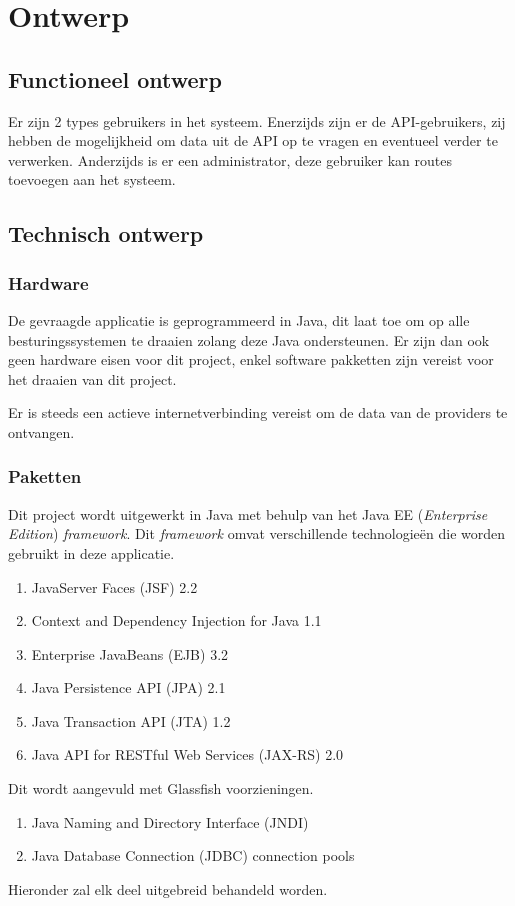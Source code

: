 \documentclass[ps,a4paper,oneside]{report}
\begin{document}
\chapter{Ontwerp}
\section{Functioneel ontwerp}
Er zijn 2 types gebruikers in het systeem. Enerzijds zijn er de API-gebruikers, zij hebben de mogelijkheid om data uit de API op te vragen en eventueel verder te verwerken. Anderzijds is er een administrator, deze gebruiker kan routes toevoegen aan het systeem.
\section{Technisch ontwerp}
\subsection{Hardware}
De gevraagde applicatie is geprogrammeerd in Java, dit laat toe om op alle besturingssystemen te draaien zolang deze Java ondersteunen. Er zijn dan ook geen hardware eisen voor dit project, enkel software pakketten zijn vereist voor het draaien van dit project.

Er is steeds een actieve internetverbinding vereist om de data van de providers te ontvangen.
\subsection{Paketten}
Dit project wordt uitgewerkt in Java met behulp van het Java EE (\textit{Enterprise Edition}) \textit{framework}. Dit \textit{framework} omvat verschillende technologie\"en die worden gebruikt in deze applicatie.
\begin{enumerate}	
	\item JavaServer Faces (JSF) 2.2
	\item Context and Dependency Injection for Java 1.1
	\item Enterprise JavaBeans (EJB) 3.2
	\item Java Persistence API (JPA) 2.1
	\item Java Transaction API (JTA) 1.2
	\item Java API for RESTful Web Services (JAX-RS) 2.0
\end{enumerate}
Dit wordt aangevuld met Glassfish voorzieningen.
\begin{enumerate}
	\item Java Naming and Directory Interface (JNDI)
	\item Java Database Connection (JDBC) connection pools
\end{enumerate}
Hieronder zal elk deel uitgebreid behandeld worden.
\end{document}
